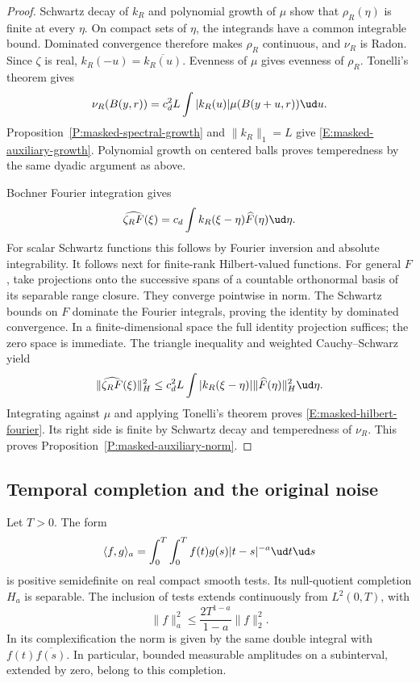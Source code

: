 \begin{proof}
  Schwartz decay of $k_R$ and polynomial growth of $\mu$ show that
  $\rho_R(\eta)$ is finite at every $\eta$. On compact sets of $\eta$,
  the integrands have a common integrable bound. Dominated convergence
  therefore makes $\rho_R$ continuous, and $\nu_R$ is Radon. Since
  $\zeta$ is real, $k_R(-u) = \overline{k_R(u)}$. Evenness of $\mu$
  gives evenness of $\rho_R$. Tonelli's theorem gives
  \[
    \nu_R(B(y,r)) = c_d^2L\int |k_R(u)|\mu(B(y+u,r))\ud u.
  \]
  Proposition~\ref{P:masked-spectral-growth} and $\|k_R\|_1 = L$ give
  \eqref{E:masked-auxiliary-growth}. Polynomial growth on centered balls
  proves temperedness by the same dyadic argument as above.

  Bochner Fourier integration gives
  \[
    \widehat{\zeta_RF}(\xi)
    = c_d\int k_R(\xi-\eta)\widehat F(\eta)\ud\eta.
  \]
  For scalar Schwartz functions this follows by Fourier inversion and
  absolute integrability. It follows next for finite-rank Hilbert-valued
  functions. For general $F$, take projections onto the successive spans
  of a countable orthonormal basis of its separable range closure.
  They converge pointwise in norm. The Schwartz bounds
  on $F$ dominate the Fourier integrals, proving the identity by dominated
  convergence. In a finite-dimensional space the full identity projection
  suffices; the zero space is immediate. The triangle inequality and
  weighted Cauchy--Schwarz yield
  \[
    \|\widehat{\zeta_RF}(\xi)\|_H^2
    \le c_d^2L\int |k_R(\xi-\eta)|\|\widehat F(\eta)\|_H^2\ud\eta.
  \]
  Integrating against $\mu$ and applying Tonelli's theorem proves
  \eqref{E:masked-hilbert-fourier}. Its right side is finite by Schwartz
  decay and temperedness of $\nu_R$.
  This proves Proposition~\ref{P:masked-auxiliary-norm}.
\end{proof}

\subsection{Temporal completion and the original noise}

\begin{lemma}\label{L:masked-time-completion}
  Let $T > 0$. The form
  \[
    \langle f,g\rangle_a
    = \int_0^T\int_0^T f(t)g(s)|t-s|^{-a}\ud t\ud s
  \]
  is positive semidefinite on real compact smooth tests. Its null-quotient
  completion $H_a$ is separable. The inclusion of tests extends continuously
  from $L^2(0,T)$, with
  \begin{equation}\label{E:masked-time-schur}
    \|f\|_a^2 \le \frac{2T^{1-a}}{1-a}\|f\|_2^2.
  \end{equation}
  In its complexification the norm is given by the same double integral
  with $f(t)\overline{f(s)}$. In particular, bounded measurable amplitudes
  on a subinterval, extended by zero, belong to this completion.
\end{lemma}

